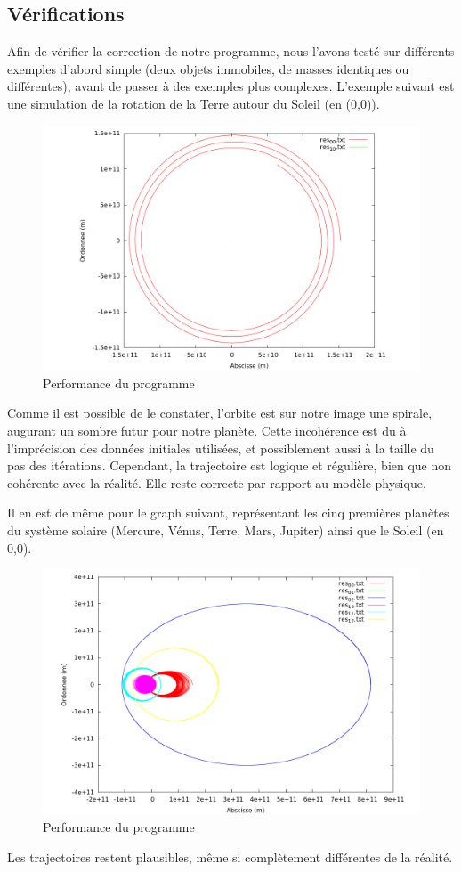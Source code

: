 \documentclass[a4paper,11pt]{article}
\begin{document}
\subsection{Vérifications}
Afin de vérifier la correction de notre programme, nous l'avons testé sur différents exemples d'abord simple (deux objets immobiles, de masses identiques ou différentes), avant de passer à des exemples plus complexes.
L'exemple suivant est une simulation de la rotation de la Terre autour du Soleil (en (0,0)).
\begin{figure}[h!]
  \centering
  \includegraphics[width=\textwidth]{orbite_terre.png}
  \caption{Performance du programme}
  \label{perf}
\end{figure}Comme il est possible de le constater, l'orbite est sur notre image une spirale, augurant un sombre futur pour notre planète. Cette incohérence est du à l'imprécision des données initiales utilisées, et possiblement aussi à la taille du pas des itérations.
Cependant, la trajectoire est logique et régulière, bien que non cohérente avec la réalité. Elle reste correcte par rapport au modèle physique.

Il en est de même pour le graph suivant, représentant les cinq premières planètes du système solaire (Mercure, Vénus, Terre, Mars, Jupiter) ainsi que le Soleil (en 0,0).
\begin{figure}[h!]
  \centering
  \includegraphics[width=\textwidth]{systeme.png}
  \caption{Performance du programme}
  \label{perf}
\end{figure}
Les trajectoires restent plausibles, même si complètement différentes de la réalité.  
\end{document}
